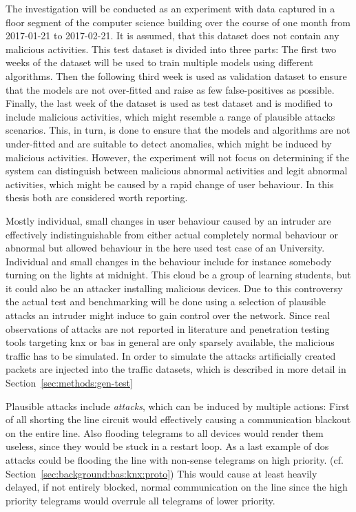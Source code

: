 The investigation will be conducted as an experiment with data captured in a floor segment of the computer science building over the course of one month from 2017-01-21 to 2017-02-21. It is assumed, that this dataset does not contain any malicious activities.
This test dataset is divided into three parts:
The first two weeks of the dataset will be used to train multiple models using different algorithms.
Then the following third week is used as validation dataset to ensure that the models are not over-fitted and raise as few false-positives as possible.
Finally, the last week of the dataset is used as test dataset and is modified to include malicious activities, which might resemble a range of plausible attacks scenarios.
This, in turn, is done to ensure that the models and algorithms are not under-fitted and are suitable to detect anomalies, which might be induced by malicious activities.
However, the experiment will not focus on determining if the system can distinguish between malicious abnormal activities and legit abnormal activities, which might be caused by a rapid change of user behaviour. In this thesis both are considered worth reporting.

Mostly individual, small changes in user behaviour caused by an intruder are effectively indistinguishable from either actual completely normal behaviour or abnormal but allowed behaviour in the  here used test case of an University. Individual and small changes in the behaviour include for instance somebody turning on the lights at midnight. This cloud be a group of learning students, but it could also be an attacker installing malicious devices.
Due to this controversy the actual test and benchmarking will be done using a selection of plausible attacks an intruder might induce to gain control over the network.
Since real observations of attacks are not reported in literature and penetration testing tools targeting \gls{knx} or \gls{bas} in general are only sparsely available, the malicious traffic has to be simulated. In order to simulate the attacks artificially created packets are injected into the traffic datasets, which is described in more detail in Section~\ref{sec:methods:gen-test}

Plausible attacks include \emph{ attacks}, which can be induced by multiple actions: First of all shorting the line circuit would effectively causing a communication blackout on the entire line. Also flooding  telegrams to all devices would render them useless, since they would be stuck in a restart loop. As a last example of \gls{dos} attacks could be flooding the line with non-sense telegrams on high priority. (cf. Section~\ref{sec:background:bas:knx:proto})
This would cause at least heavily delayed, if not entirely blocked, normal communication on the line since the high priority telegrams would overrule all telegrams of lower priority.

